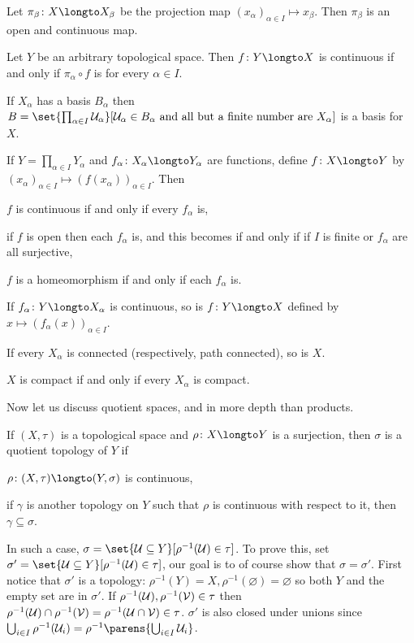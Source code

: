 \benum
    \item Let $\pi_\beta\colon X\longto X_\beta$ be the projection map $(x_\alpha)_{\alpha\in I}\mapsto x_\beta$.
    Then $\pi_\beta$ is an open and continuous map.
    \item Let $Y$ be an arbitrary topological space.
    Then $f\colon Y\longto X$ is continuous if and only if $\pi_\alpha\circ f$ is for every $\alpha\in I$.
    \item If $X_\alpha$ has a basis $B_\alpha$ then $B=\set{\prod_{\alpha\in I}\U_\alpha}[\hbox{$\U_\alpha\in B_\alpha$ and all but a finite number are $X_\alpha$}]$ is a basis for $X$.
    \item If $Y=\prod_{\alpha\in I}Y_\alpha$ and $f_\alpha\colon X_\alpha\longto Y_\alpha$ are functions, define $f\colon X\longto Y$ by $(x_\alpha)_{\alpha\in I}\mapsto(f(x_\alpha))_{\alpha\in I}$.
    Then
    \benum
        \item $f$ is continuous if and only if every $f_\alpha$ is,
        \item if $f$ is open then each $f_\alpha$ is, and this becomes if and only if if $I$ is finite or $f_\alpha$ are all surjective,
        \item $f$ is a homeomorphism if and only if each $f_\alpha$ is.
    \eenum
    \item If $f_\alpha\colon Y\longto X_\alpha$ is continuous, so is $f\colon Y\longto X$ defined by $x\mapsto(f_\alpha(x))_{\alpha\in I}$.
    \item If every $X_\alpha$ is connected (respectively, path connected), so is $X$.
    \item $X$ is compact if and only if every $X_\alpha$ is compact.
\eenum

Now let us discuss quotient spaces, and in more depth than products.

\bdefn

    If $(X,\tau)$ is a topological space and $\rho\colon X\longto Y$ is a surjection, then $\sigma$ is a {\emphcolor quotient topology} of $Y$ if
    \benum
        \item $\rho\colon(X,\tau)\longto(Y,\sigma)$ is continuous,
        \item if $\gamma$ is another topology on $Y$ such that $\rho$ is continuous with respect to it, then $\gamma\subseteq\sigma$.
    \eenum

\edefn

In such a case, $\sigma=\set{\U\subseteq Y}[\rho^{-1}(\U)\in\tau]$.
To prove this, set $\sigma'=\set{\U\subseteq Y}[\rho^{-1}(\U)\in\tau]$, our goal is to of course show that $\sigma=\sigma'$.
First notice that $\sigma'$ is a topology: $\rho^{-1}(Y)=X,\rho^{-1}(\varnothing)=\varnothing$ so both $Y$ and the empty set are in $\sigma'$.
If $\rho^{-1}({\cal U}),\rho^{-1}({\cal V})\in\tau$ then $\rho^{-1}({\cal U})\cap\rho^{-1}({\cal V})=\rho^{-1}({\cal U}\cap{\cal V})\in\tau$.
$\sigma'$ is also closed under unions since $\bigcup_{i\in I}\rho^{-1}(\U_i)=\rho^{-1}\parens{\bigcup_{i\in I}\U_i}$.

